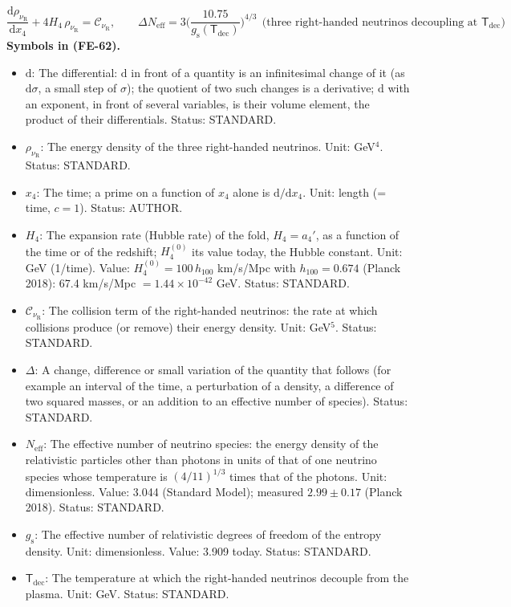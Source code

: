 \documentclass[
  10pt,
]{article}
\providecommand{\tightlist}{%
  \setlength{\itemsep}{0pt}\setlength{\parskip}{0pt}}
\begin{document}
\[
\frac{\mathrm{d}\rho_{\nu_{\mathrm{R}}}}{\mathrm{d}x_4} + 4H_4\,\rho_{\nu_{\mathrm{R}}} = \mathcal{C}_{\nu_{\mathrm{R}}},\qquad
\Delta N_{\mathrm{eff}} = 3\Big(\frac{10.75}{g_{\mathrm{s}}(\mathsf{T}_{\mathrm{dec}})}\Big)^{4/3}\ \ \text{(three right-handed neutrinos decoupling at } \mathsf{T}_{\mathrm{dec}}) \tag{FE-62}
\] \textbf{Symbols in (FE-62).}

\begin{itemize}
\tightlist
\item
  \(\mathrm{d}\): The differential: \(\mathrm{d}\) in front of a
  quantity is an infinitesimal change of it (as \(\mathrm{d}\sigma\), a
  small step of \(\sigma\)); the quotient of two such changes is a
  derivative; \(\mathrm{d}\) with an exponent, in front of several
  variables, is their volume element, the product of their
  differentials. Status: STANDARD.
\item
  \(\rho_{\nu_{\mathrm{R}}}\): The energy density of the three
  right-handed neutrinos. Unit: GeV\(^4\). Status: STANDARD.
\item
  \(x_4\): The time; a prime on a function of \(x_4\) alone is
  \(\mathrm{d}/\mathrm{d}x_4\). Unit: length (= time, \(c = 1\)).
  Status: AUTHOR.
\item
  \(H_4\): The expansion rate (Hubble rate) of the fold, \(H_4 = a_4'\),
  as a function of the time or of the redshift; \(H_4^{(0)}\) its value
  today, the Hubble constant. Unit: GeV (1/time). Value:
  \(H_4^{(0)} = 100\,h_{100}\) km/s/Mpc with \(h_{100} = 0.674\) (Planck
  2018): 67.4 km/s/Mpc \(= 1.44\times10^{-42}\) GeV. Status: STANDARD.
\item
  \(\mathcal{C}_{\nu_{\mathrm{R}}}\): The collision term of the
  right-handed neutrinos: the rate at which collisions produce (or
  remove) their energy density. Unit: GeV\(^5\). Status: STANDARD.
\item
  \(\Delta\): A change, difference or small variation of the quantity
  that follows (for example an interval of the time, a perturbation of a
  density, a difference of two squared masses, or an addition to an
  effective number of species). Status: STANDARD.
\item
  \(N_{\mathrm{eff}}\): The effective number of neutrino species: the
  energy density of the relativistic particles other than photons in
  units of that of one neutrino species whose temperature is
  \((4/11)^{1/3}\) times that of the photons. Unit: dimensionless.
  Value: 3.044 (Standard Model); measured \(2.99 \pm 0.17\) (Planck
  2018). Status: STANDARD.
\item
  \(g_{\mathrm{s}}\): The effective number of relativistic degrees of
  freedom of the entropy density. Unit: dimensionless. Value: 3.909
  today. Status: STANDARD.
\item
  \(\mathsf{T}_{\mathrm{dec}}\): The temperature at which the
  right-handed neutrinos decouple from the plasma. Unit: GeV. Status:
  STANDARD.
\end{itemize}
\end{document}
